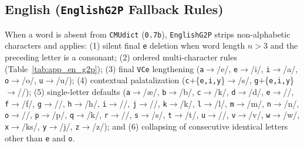 \documentclass[preprint,12pt,authoryear]{elsarticle}
\begin{document}
\subsection{English (\texttt{EnglishG2P} Fallback Rules)}
When a word is absent from \texttt{CMUdict} (\texttt{0.7b}), \texttt{EnglishG2P} strips non-alphabetic characters and applies: (1) silent final \texttt{e} deletion when word length $n > 3$ and the preceding letter is a consonant; (2) ordered multi-character rules (Table~\ref{tab:app_en_g2p}); (3) final \texttt{VCe} lengthening (\texttt{a}$\rightarrow$/e\textsci/, \texttt{e}$\rightarrow$/i/, \texttt{i}$\rightarrow$/a\textsci/, \texttt{o}$\rightarrow$/o\textupsilon/, \texttt{u}$\rightarrow$/u/); (4) contextual palatalization (\texttt{c}$+$\{\texttt{e,i,y}\}$\rightarrow$/s/, \texttt{g}$+$\{\texttt{e,i,y}\}$\rightarrow$/\textdyoghlig/); (5) single-letter defaults (\texttt{a}$\rightarrow$/\ae/, \texttt{b}$\rightarrow$/b/, \texttt{c}$\rightarrow$/k/, \texttt{d}$\rightarrow$/d/, \texttt{e}$\rightarrow$/\textepsilon/, \texttt{f}$\rightarrow$/f/, \texttt{g}$\rightarrow$//, \texttt{h}$\rightarrow$/h/, \texttt{i}$\rightarrow$/\textsci/, \texttt{j}$\rightarrow$/\textdyoghlig/, \texttt{k}$\rightarrow$/k/, \texttt{l}$\rightarrow$/l/, \texttt{m}$\rightarrow$/m/, \texttt{n}$\rightarrow$/n/, \texttt{o}$\rightarrow$/\textscripta/, \texttt{p}$\rightarrow$/p/, \texttt{q}$\rightarrow$/k/, \texttt{r}$\rightarrow$/\textturnr/, \texttt{s}$\rightarrow$/s/, \texttt{t}$\rightarrow$/t/, \texttt{u}$\rightarrow$/\textturnv/, \texttt{v}$\rightarrow$/v/, \texttt{w}$\rightarrow$/w/, \texttt{x}$\rightarrow$/ks/, \texttt{y}$\rightarrow$/j/, \texttt{z}$\rightarrow$/z/); and (6) collapsing of consecutive identical letters other than \texttt{e} and \texttt{o}.
\end{document}
